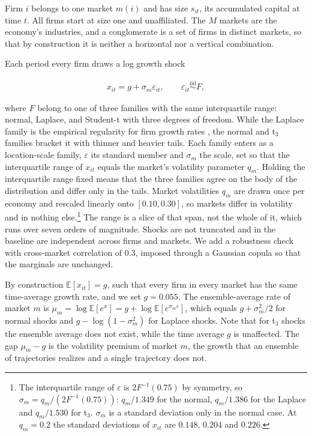\documentclass[12pt,a4paper]{article}
\begin{document}
Firm $i$ belongs to one market $m(i)$ and has size $s_{it}$, its accumulated capital at time $t$. All firms start at size one and unaffiliated. The $M$ markets are the economy's industries, and a conglomerate is a set of firms in distinct markets, so that by construction it is neither a horizontal nor a vertical combination.

Each period every firm draws a log growth shock

\begin{gather}
    x_{it} = g + \sigma_m \varepsilon_{it}, \qquad \varepsilon_{it} \overset{\text{iid}}{\sim} F,
\end{gather}

where $F$ belong to one of three families with the same interquartile range: normal, Laplace, and Student-t with three degrees of freedom. While the Laplace family is the empirical regularity for firm growth rates \parencite{stanley1996scaling,bottazzi2006explaining}, the normal and t$_3$ families bracket it with thinner and heavier tails. Each family enters as a location-scale family, $\varepsilon$ its standard member and $\sigma_m$ the scale, set so that the interquartile range of $x_{it}$ equals the market's volatility parameter $q_m$. Holding the interquartile range fixed means that the three families agree on the body of the distribution and differ only in the tails. Market volatilities $q_m$ are drawn once per economy and rescaled linearly onto $[0.10, 0.30]$, so markets differ in volatility and in nothing else.\footnote{
The interquartile range of $\varepsilon$ is $2F^{-1}(0.75)$ by symmetry, so $\sigma_m = q_m/(2F^{-1}(0.75))$: $q_m/1.349$ for the normal, $q_m/1.386$ for the Laplace and $q_m/1.530$ for t$_3$. $\sigma_m$ is a standard deviation only in the normal case. At $q_m = 0.2$ the standard deviations of $x_{it}$ are $0.148$, $0.204$ and $0.226$.} The range is a slice of that span, not the whole of it, which runs over seven orders of magnitude. Shocks are not truncated and in the baseline are independent across firms and markets. We add a robustness check with cross-market correlation of $0.3$, imposed through a Gaussian copula so that the marginals are unchanged.

By construction $\mathbb{E}[x_{it}] = g$, such that every firm in every market has the same time-average growth rate, and we set $g = 0.055$. The ensemble-average rate of market $m$ is $\mu_m = \log \mathbb{E}[e^{x}] = g + \log \mathbb{E}[e^{\sigma_m \varepsilon}]$, which equals $g + \sigma_m^2/2$ for normal shocks and $g - \log(1 - \sigma_m^2)$ for Laplace shocks. Note that for t$_3$ shocks the ensemble average does not exist, while the time average $g$ is unaffected. The gap $\mu_m - g$ is the volatility premium of market $m$, the growth that an ensemble of trajectories realizes and a single trajectory does not.
\end{document}
